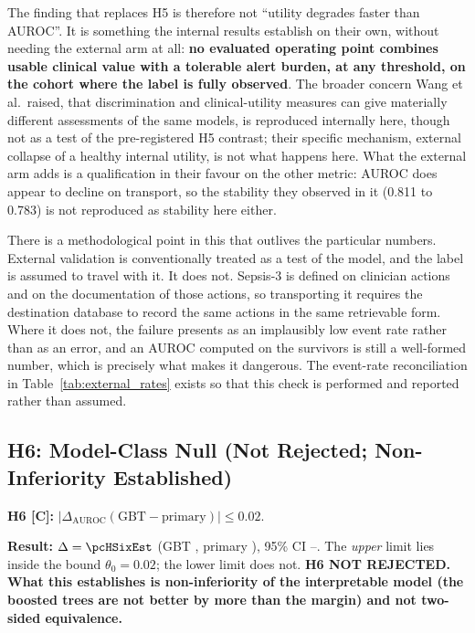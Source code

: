 The finding that replaces H5 is therefore not ``utility degrades faster than
AUROC''. It is something the internal results establish on their own, without
needing the external arm at all: \textbf{no evaluated operating point combines
usable clinical value with a tolerable alert burden, at any
threshold, on the cohort where the label is fully observed}. The broader
concern Wang et al.\ raised, that discrimination and clinical-utility measures
can give materially different assessments of the same models, is reproduced
internally here, though not as a test of the pre-registered H5 contrast; their
specific mechanism, external collapse of a healthy internal utility, is not
what happens here. What the
external arm adds is a qualification in their favour on the other metric: AUROC
does appear to decline on transport, so the stability they observed in it
(0.811 to 0.783) is not reproduced as stability here either.

There is a methodological point in this that outlives the particular numbers.
External validation is conventionally treated as a test of the model, and the
label is assumed to travel with it. It does not. Sepsis-3 is defined on
clinician actions and on the documentation of those actions, so transporting it
requires the destination database to record the same actions in the same
retrievable form. Where it does not, the failure presents as an implausibly low
event rate rather than as an error, and an AUROC computed on the survivors is
still a well-formed number, which is precisely what makes it dangerous. The
event-rate reconciliation in Table~\ref{tab:external_rates} exists so that this
check is performed and reported rather than assumed.

\subsection{H6: Model-Class Null (Not Rejected; Non-Inferiority Established)}
\label{sec:h6}

\begin{mdframed}[backgroundcolor=ATUSand!30, linecolor=ATUGreen]
    \textbf{H6 [C]:} $|\Delta_\text{AUROC}(\text{GBT} - \text{primary})| \leq 0.02$.

    \textbf{Result:} $\Delta = \pcHSixEst$ (GBT \pcAurocGbtB, primary
    \pcAurocPrimaryB), 95\% CI \pcHSixCiLo--\pcHSixCiHi. The \emph{upper} limit
    lies inside the bound $\theta_0 = 0.02$; the lower limit does not.
    \textbf{H6 NOT REJECTED. What this establishes is non-inferiority of the
    interpretable model (the boosted trees are not better by more than the
    margin) and not two-sided equivalence.}
\end{mdframed}

